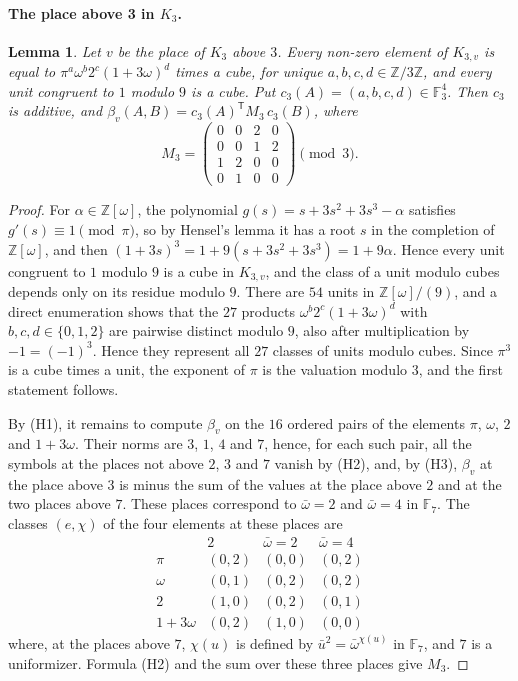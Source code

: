 \documentclass[11pt]{article}
\newtheorem{lemma}[theorem]{Lemma}
\newcommand{\Z}{\mathbb{Z}}
\newcommand{\F}{\mathbb{F}}
\begin{document}
\paragraph{The place above 3 in $K_3$.}
\begin{lemma}\label{lem:M3}
Let $v$ be the place of $K_3$ above $3$. Every non-zero element of $K_{3,v}$ is equal to $\pi^a\omega^b2^c(1+3\omega)^d$ times a cube, for unique $a,b,c,d\in\Z/3\Z$, and every unit congruent to $1$ modulo $9$ is a cube. Put $c_3(A)=(a,b,c,d)\in\F_3^4$. Then $c_3$ is additive, and $\beta_v(A,B)=c_3(A)^{\mathsf T}M_3\,c_3(B)$, where
\[
M_3=\begin{pmatrix}0&0&2&0\\0&0&1&2\\1&2&0&0\\0&1&0&0\end{pmatrix}\pmod3.
\]
\end{lemma}

\begin{proof}
For $\alpha\in\Z[\omega]$, the polynomial $g(s)=s+3s^2+3s^3-\alpha$ satisfies $g'(s)\equiv1\pmod\pi$, so by Hensel's lemma it has a root $s$ in the completion of $\Z[\omega]$, and then $(1+3s)^3=1+9(s+3s^2+3s^3)=1+9\alpha$. Hence every unit congruent to $1$ modulo $9$ is a cube in $K_{3,v}$, and the class of a unit modulo cubes depends only on its residue modulo $9$. There are $54$ units in $\Z[\omega]/(9)$, and a direct enumeration shows that the $27$ products $\omega^b2^c(1+3\omega)^d$ with $b,c,d\in\{0,1,2\}$ are pairwise distinct modulo $9$, also after multiplication by $-1=(-1)^3$. Hence they represent all $27$ classes of units modulo cubes. Since $\pi^3$ is a cube times a unit, the exponent of $\pi$ is the valuation modulo $3$, and the first statement follows.

By (H1), it remains to compute $\beta_v$ on the $16$ ordered pairs of the elements $\pi$, $\omega$, $2$ and $1+3\omega$. Their norms are $3$, $1$, $4$ and $7$, hence, for each such pair, all the symbols at the places not above $2$, $3$ and $7$ vanish by (H2), and, by (H3), $\beta_v$ at the place above $3$ is minus the sum of the values at the place above $2$ and at the two places above $7$. These places correspond to $\bar\omega=2$ and $\bar\omega=4$ in $\F_7$. The classes $(e,\chi)$ of the four elements at these places are
\[
\begin{array}{c|ccc}
 & 2 & \bar\omega=2 & \bar\omega=4\\\hline
\pi & (0,2) & (0,0) & (0,2)\\
\omega & (0,1) & (0,2) & (0,2)\\
2 & (1,0) & (0,2) & (0,1)\\
1+3\omega & (0,2) & (1,0) & (0,0)
\end{array}
\]
where, at the places above $7$, $\chi(u)$ is defined by $\bar u^2=\bar\omega^{\chi(u)}$ in $\F_7$, and $7$ is a uniformizer. Formula (H2) and the sum over these three places give $M_3$.
\end{proof}
\end{document}
